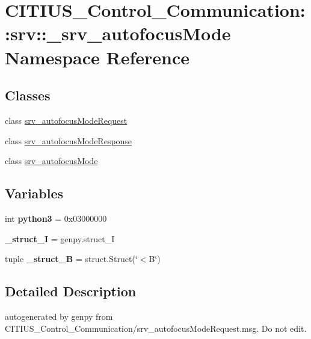 \hypertarget{namespace_c_i_t_i_u_s___control___communication_1_1srv_1_1__srv__autofocus_mode}{\section{\-C\-I\-T\-I\-U\-S\-\_\-\-Control\-\_\-\-Communication\-:\-:srv\-:\-:\-\_\-srv\-\_\-autofocus\-Mode \-Namespace \-Reference}
\label{namespace_c_i_t_i_u_s___control___communication_1_1srv_1_1__srv__autofocus_mode}
}
\subsection*{\-Classes}
\begin{DoxyCompactItemize}
\item 
class \hyperlink{class_c_i_t_i_u_s___control___communication_1_1srv_1_1__srv__autofocus_mode_1_1srv__autofocus_mode_request}{srv\-\_\-autofocus\-Mode\-Request}
\item 
class \hyperlink{class_c_i_t_i_u_s___control___communication_1_1srv_1_1__srv__autofocus_mode_1_1srv__autofocus_mode_response}{srv\-\_\-autofocus\-Mode\-Response}
\item 
class \hyperlink{class_c_i_t_i_u_s___control___communication_1_1srv_1_1__srv__autofocus_mode_1_1srv__autofocus_mode}{srv\-\_\-autofocus\-Mode}
\end{DoxyCompactItemize}
\subsection*{\-Variables}
\begin{DoxyCompactItemize}
\item 
\hypertarget{namespace_c_i_t_i_u_s___control___communication_1_1srv_1_1__srv__autofocus_mode_a12f56ec3aa79a5ce0e975a83e9d426b2}{int {\bfseries python3} = 0x03000000}\label{namespace_c_i_t_i_u_s___control___communication_1_1srv_1_1__srv__autofocus_mode_a12f56ec3aa79a5ce0e975a83e9d426b2}

\item 
\hypertarget{namespace_c_i_t_i_u_s___control___communication_1_1srv_1_1__srv__autofocus_mode_a27df4a7fbe9c3895f0e6335436f37b19}{{\bfseries \-\_\-struct\-\_\-\-I} = genpy.\-struct\-\_\-\-I}\label{namespace_c_i_t_i_u_s___control___communication_1_1srv_1_1__srv__autofocus_mode_a27df4a7fbe9c3895f0e6335436f37b19}

\item 
\hypertarget{namespace_c_i_t_i_u_s___control___communication_1_1srv_1_1__srv__autofocus_mode_a59324a375bb3081881c757a39d0fa448}{tuple {\bfseries \-\_\-struct\-\_\-\-B} = struct.\-Struct(\char`\"{}$<$\-B\char`\"{})}\label{namespace_c_i_t_i_u_s___control___communication_1_1srv_1_1__srv__autofocus_mode_a59324a375bb3081881c757a39d0fa448}

\end{DoxyCompactItemize}


\subsection{\-Detailed \-Description}
\begin{DoxyVerb}autogenerated by genpy from CITIUS_Control_Communication/srv_autofocusModeRequest.msg. Do not edit.\end{DoxyVerb}
 